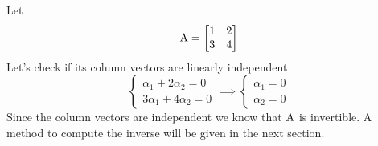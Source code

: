 \begin{example}
    Let
    $$
        \mathrm{A} = \left[\begin{matrix}
        1 & 2 \\
        3 & 4
        \end{matrix}\right]
    $$
    Let's check if its column vectors are linearly independent
    $$
    \left\{\begin{matrix}
    \alpha_1 + 2\alpha_2 = 0 \\
    3\alpha_1 + 4\alpha_2 = 0
    \end{matrix}\right. \implies
    \left\{\begin{matrix}
    \alpha_1 = 0 \\
    \alpha_2 = 0
    \end{matrix}\right.
    $$
    Since the column vectors are independent we know that $\mathrm{A}$ is invertible. A method to compute the inverse will be given in the next section.
\end{example}